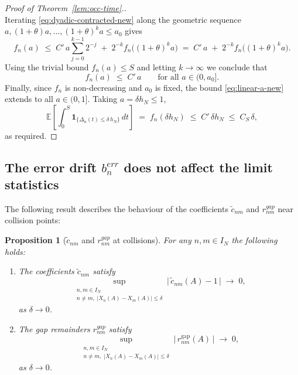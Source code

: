 \documentclass[12pt,reqno]{amsart}
\theoremstyle{plain}
\newtheorem{prop}{Proposition}[section]
\theoremstyle{definition}
\theoremstyle{remark}
\begin{document}
\begin{proof}[Proof of Theorem~\ref{lem:occ-time}.]
\begin{equation}
\end{equation}
Iterating \eqref{eq:dyadic-contracted-new} along the geometric sequence
$a,(1+\theta)a,\dots,(1+\theta)^k a\le a_0$ gives
\begin{equation}
f_n(a)\;\le\; C' \,a\sum_{j=0}^{k-1}2^{-j}\;+\;2^{-k}f_n\!\big((1+\theta)^k a\big)
\;=\; C' \,a\;+\;2^{-k}f_n\!\big((1+\theta)^k a\big).
\end{equation}
Using the trivial bound $f_n(a)\le S$ and letting $k\to\infty$ we conclude that
\begin{equation}\label{eq:linear-a-new}
f_n(a)\;\le\; C' \,a \qquad \text{for all } a\in(0,a_0].
\end{equation}
Finally, since $f_n$ is non-decreasing and $a_0$ is fixed, the bound
\eqref{eq:linear-a-new} extends to all $a\in(0,1]$. Taking $a=\delta h_N\le 1$,
\begin{equation}
\mathbb{E}\!\left[\int_0^S \mathbf{1}_{\{\Delta_n(t)\le \delta\,h_N\}}\,dt\right]
\;=\; f_n(\delta h_N)
\;\le\; C' \,\delta h_N
\;\le\; C_S\,\delta ,
\end{equation}
as required.
\end{proof}


\subsection{The error drift $b^{err}_n$ does not affect the limit statistics} 

The following result describes the behaviour of the coefficients $\widetilde{c}_{nm}$ and $r_{nm}^{gap}$ near collision points:
\begin{prop}[$\widetilde{c}_{nm}$ and $r^{gap}_{nm}$ at collisions]
\label{prop:c-and-r-gap-collision} For any $n,m \in I_N$ the following holds:
\begin{enumerate}
\item The coefficients $\widetilde{c}_{nm}$ satisfy 
\begin{equation}
\sup_{\substack{n,m\in I_N\\ n\neq m,\;|X_n(A)-X_m(A)|\le \delta}}
\big|\,\widetilde c_{nm}(A)-1\,\big| \;\longrightarrow\; 0,
\end{equation} as $\delta \to 0$. 

\item The gap remainders $r^{gap}_{nm}$ satisfy 
\begin{equation} \sup_{\substack{n,m\in I_N\\ n\neq m,\;|X_n(A)-X_m(A)|\le \delta}}
\big|\,r^{\mathrm{gap}}_{nm}(A)\,\big| \;\longrightarrow\; 0, 
\end{equation} 
as $\delta \to 0$.
\end{enumerate}
\end{prop}
\end{document}
